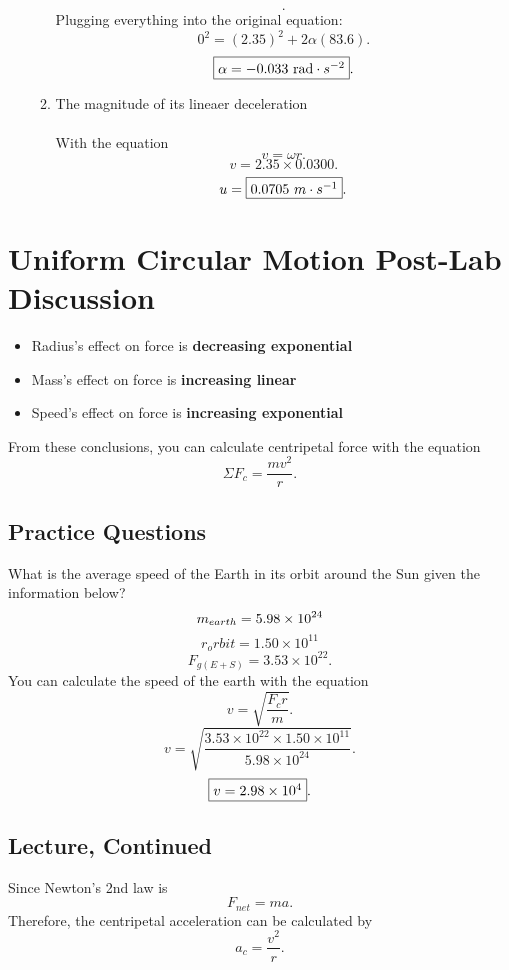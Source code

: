 \documentclass[a4paper]{report}
\begin{document}
\begin{enumerate}
\begin{enumerate}
\[                    .\] 
                    Plugging everything into the original equation:
                    \[
                        0^2 = (2.35)^2 + 2\alpha(83.6)
                    .\] 
                    \[
                        \fbox{$\alpha = -0.033\ \text{rad} \cdot s^{-2}$}
                    .\] 
                    \item The magnitude of its lineaer deceleration \\ \\ 
                        With the equation 
                         \[
                        v= \omega r
                        .\] 
                        \[
                        v = 2.35 \times 0.0300
                        .\] 
                        \[
                        u = \fbox{$0.0705\ m \cdot s^{-1}$}
                        .\] 
            \end{enumerate}
    \end{enumerate}
    \section{Uniform Circular Motion Post-Lab Discussion}
    \begin{itemize}
        \item Radius's effect on force is \textbf{decreasing exponential}
        \item Mass's effect on force is \textbf{increasing linear}
        \item Speed's effect on force is \textbf{increasing exponential}
    \end{itemize}
    From these conclusions, you can calculate centripetal force with the equation
    \[
    \Sigma F_c = \frac{mv^2}{r}
    .\] 
    \subsection{Practice Questions}
    What is the average speed of the Earth in its orbit around the Sun given the information below?
    \[
        m_{earth} = 5.98 \times  10^{24}  \\ 
    \] 
    \[
    r_orbit = 1.50 \times 10^{11} 
\]
\[    
    F_{g(E+S)} = 3.53 \times 10^{22}
    .\] 
    You can calculate the speed of the earth with the equation 
    \[
    v = \sqrt{\frac{F_c r}{m}} 
    .\] 
    \[
        v = \sqrt{\frac{3.53 \times 10^{22} \times 1.50 \times 10^{11}}{5.98 \times 10^{24}}} 
    .\] 
    \[
        \fbox{$v = 2.98 \times 10^4$}
    .\] 
    \subsection{Lecture, Continued}
    Since Newton's 2nd law is 
    \[
        F_{net} = ma
    .\] 
    Therefore, the centripetal acceleration can be calculated by 
    \[
    a_c = \frac{v^2}{r}
    .\] 
\end{document}
